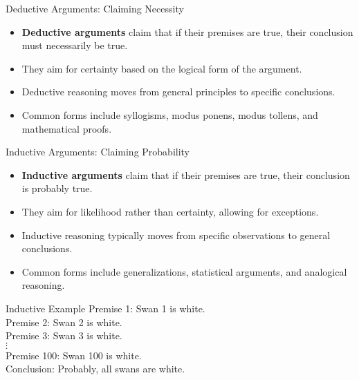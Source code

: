 \documentclass{beamer}
\begin{document}
\begin{frame}{Deductive Arguments: Claiming Necessity}
    \begin{itemize}
        \item \textbf{Deductive arguments} claim that if their premises are true, their conclusion must necessarily be true.
        \item They aim for certainty based on the logical form of the argument.
        \item Deductive reasoning moves from general principles to specific conclusions.
        \item Common forms include syllogisms, modus ponens, modus tollens, and mathematical proofs.
    \end{itemize}
    
\end{frame}

\begin{frame}{Inductive Arguments: Claiming Probability}
    \begin{itemize}
        \item \textbf{Inductive arguments} claim that if their premises are true, their conclusion is probably true.
        \item They aim for likelihood rather than certainty, allowing for exceptions.
        \item Inductive reasoning typically moves from specific observations to general conclusions.
        \item Common forms include generalizations, statistical arguments, and analogical reasoning.
    \end{itemize}
    
    \begin{exampleblock}{Inductive Example}
        Premise 1: Swan 1 is white.\\
        Premise 2: Swan 2 is white.\\
        Premise 3: Swan 3 is white.\\
        $\vdots$\\
        Premise 100: Swan 100 is white.\\
        Conclusion: Probably, all swans are white.
    \end{exampleblock}
\end{frame}
\end{document}
